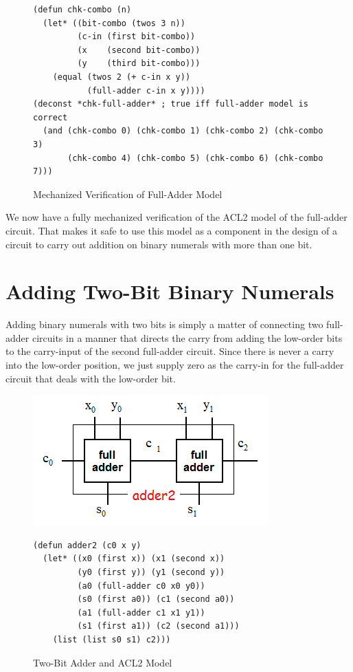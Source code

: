\begin{figure}
\begin{center}
\begin{Verbatim}
(defun chk-combo (n)
  (let* ((bit-combo (twos 3 n))
         (c-in (first bit-combo))
         (x    (second bit-combo))
         (y    (third bit-combo)))
    (equal (twos 2 (+ c-in x y))
           (full-adder c-in x y))))
(deconst *chk-full-adder* ; true iff full-adder model is correct
  (and (chk-combo 0) (chk-combo 1) (chk-combo 2) (chk-combo 3)
       (chk-combo 4) (chk-combo 5) (chk-combo 6) (chk-combo 7)))
\end{Verbatim}
\end{center}
\caption{Mechanized Verification of Full-Adder Model}
\label{fig:full-adder-model-check}
\end{figure}

We now have a fully mechanized verification
of the ACL2 model of the full-adder circuit.
That makes it safe to use this model as a component
in the design of a circuit to carry out addition on binary numerals
with more than one bit.

\section{Adding Two-Bit Binary Numerals}
\label{sec:adding-2-bit-numerals}

Adding binary numerals with two bits is simply a matter
of connecting two full-adder circuits in a manner that
directs the carry from adding the low-order bits
to the carry-input of the second full-adder circuit.
Since there is never a carry into the low-order position,
we just supply zero as the carry-in for the full-adder circuit
that deals with the low-order bit.

\begin{figure}
\begin{center}
\includegraphics[scale=0.9]{Images/adder2.png}
\begin{Verbatim}
(defun adder2 (c0 x y)
  (let* ((x0 (first x)) (x1 (second x))
         (y0 (first y)) (y1 (second y))
         (a0 (full-adder c0 x0 y0))
         (s0 (first a0)) (c1 (second a0))
         (a1 (full-adder c1 x1 y1))
         (s1 (first a1)) (c2 (second a1)))
    (list (list s0 s1) c2)))
\end{Verbatim}
\end{center}
\caption{Two-Bit Adder and ACL2 Model}
\label{fig:adder2}
\end{figure}

